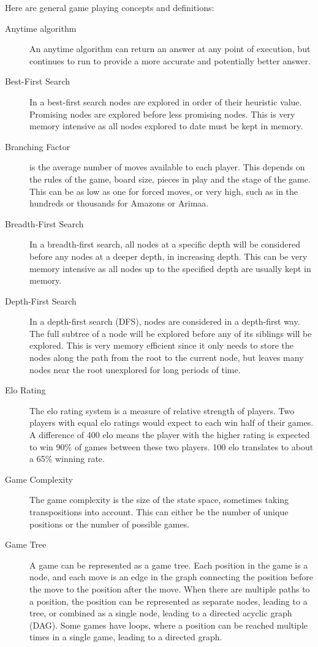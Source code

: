 

Here are general game playing concepts and definitions:

\begin{description}
\item[Anytime algorithm] An anytime algorithm can return an answer at any point of execution, but continues to run to provide a more accurate and potentially better answer.
\item[Best-First Search] In a best-first search nodes are explored in order of their heuristic value. Promising nodes are explored before less promising nodes. This is very memory intensive as all nodes explored to date must be kept in memory.
\item[Branching Factor] is the average number of moves available to each player. This depends on the rules of the game, board size, pieces in play and the stage of the game. This can be as low as one for forced moves, or very high, such as in the hundreds or thousands for Amazons or Arimaa.
\item[Breadth-First Search] In a breadth-first search, all nodes at a specific depth will be considered before any nodes at a deeper depth, in increasing depth. This can be very memory intensive as all nodes up to the specified depth are usually kept in memory.
\item[Depth-First Search] In a depth-first search (DFS), nodes are considered in a depth-first way. The full subtree of a node will be explored before any of its siblings will be explored. This is very memory efficient since it only needs to store the nodes along the path from the root to the current node, but leaves many nodes near the root unexplored for long periods of time.
\item[Elo Rating] The elo rating system is a measure of relative strength of players. Two players with equal elo ratings would expect to each win half of their games. A difference of 400 elo means the player with the higher rating is expected to win 90\% of games between these two players. 100 elo translates to about a 65\% winning rate.
\item[Game Complexity] The game complexity is the size of the state space, sometimes taking transpositions into account. This can either be the number of unique positions or the number of possible games.
\item[Game Tree] A game can be represented as a game tree. Each position in the game is a node, and each move is an edge in the graph connecting the position before the move to the position after the move. When there are multiple paths to a position, the position can be represented as separate nodes, leading to a tree, or combined as a single node, leading to a directed acyclic graph (DAG). Some games have loops, where a position can be reached multiple times in a single game, leading to a directed graph.

\end{description}
